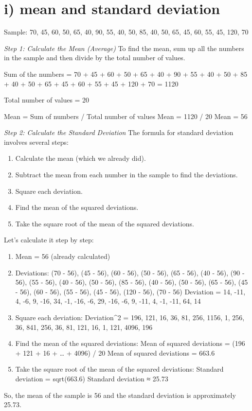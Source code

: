 \documentclass[
]{article}
\author{}
\date{\vspace{-2.5em}}
\providecommand{\tightlist}{%
  \setlength{\itemsep}{0pt}\setlength{\parskip}{0pt}}
\begin{document}
\hypertarget{i-mean-and-standard-deviation}{%
\section{i) mean and standard
deviation}\label{i-mean-and-standard-deviation}}

Sample: 70, 45, 60, 50, 65, 40, 90, 55, 40, 50, 85, 40, 50, 65, 45, 60,
55, 45, 120, 70

\emph{Step 1: Calculate the Mean (Average)} To find the mean, sum up all
the numbers in the sample and then divide by the total number of values.

Sum of the numbers = 70 + 45 + 60 + 50 + 65 + 40 + 90 + 55 + 40 + 50 +
85 + 40 + 50 + 65 + 45 + 60 + 55 + 45 + 120 + 70 = 1120

Total number of values = 20

Mean = Sum of numbers / Total number of values Mean = 1120 / 20 Mean =
56

\emph{Step 2: Calculate the Standard Deviation} The formula for standard
deviation involves several steps:

\begin{enumerate}
\def\labelenumi{\alph{enumi}.}
\tightlist
\item
  Calculate the mean (which we already did).
\item
  Subtract the mean from each number in the sample to find the
  deviations.
\item
  Square each deviation.
\item
  Find the mean of the squared deviations.
\item
  Take the square root of the mean of the squared deviations.
\end{enumerate}

Let's calculate it step by step:

\begin{enumerate}
\def\labelenumi{\alph{enumi}.}
\item
  Mean = 56 (already calculated)
\item
  Deviations: (70 - 56), (45 - 56), (60 - 56), (50 - 56), (65 - 56), (40
  - 56), (90 - 56), (55 - 56), (40 - 56), (50 - 56), (85 - 56), (40 -
  56), (50 - 56), (65 - 56), (45 - 56), (60 - 56), (55 - 56), (45 - 56),
  (120 - 56), (70 - 56) Deviation = 14, -11, 4, -6, 9, -16, 34, -1, -16,
  -6, 29, -16, -6, 9, -11, 4, -1, -11, 64, 14
\item
  Square each deviation: Deviation\^{}2 = 196, 121, 16, 36, 81, 256,
  1156, 1, 256, 36, 841, 256, 36, 81, 121, 16, 1, 121, 4096, 196
\item
  Find the mean of the squared deviations: Mean of squared deviations =
  (196 + 121 + 16 + \ldots{} + 4096) / 20 Mean of squared deviations =
  663.6
\item
  Take the square root of the mean of the squared deviations: Standard
  deviation = sqrt(663.6) Standard deviation ≈ 25.73
\end{enumerate}

So, the mean of the sample is 56 and the standard deviation is
approximately 25.73.
\end{document}
